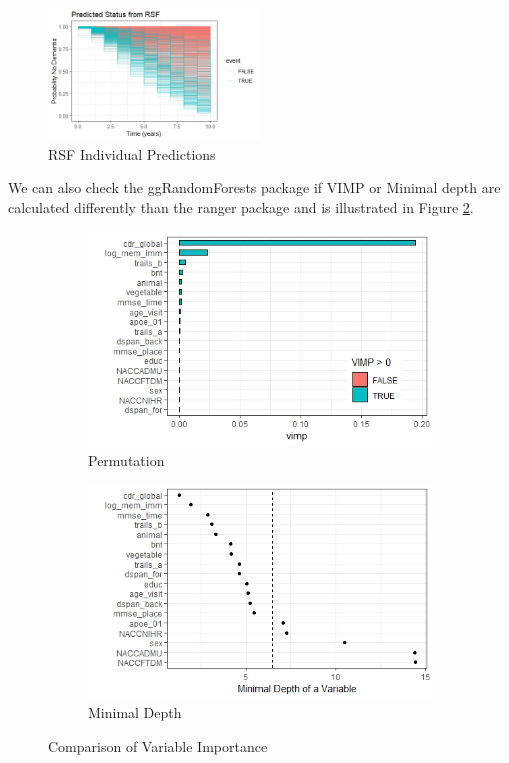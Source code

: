 \documentclass[a4paper,man,natbib,11pt]{article}
\begin{document}
\begin{figure}[h!]%
    \centering
    \includegraphics[width=0.5\textwidth]{figures/Predicted_Individual_RSF.jpeg}
    \caption{RSF Individual Predictions}%
    \label{fig:RSF_pred}%
\end{figure}

We can also check the ggRandomForests package if VIMP or Minimal depth are calculated differently than the ranger package and is illustrated in Figure \ref{fig:ggVI}. 

\begin{figure}[h!]
\centering
\begin{subfigure}{.5\textwidth}
  \centering
  \includegraphics[width=\linewidth]{figures/VI_SRF.jpeg}
  \caption{Permutation}
\end{subfigure}%
\begin{subfigure}{.5\textwidth}
  \centering
  \includegraphics[width=\linewidth]{figures/MD_SRF.jpeg}
  \caption{Minimal Depth}
\end{subfigure}
\caption{Comparison of Variable Importance}
\label{fig:ggVI}
\end{figure}
\end{document}
